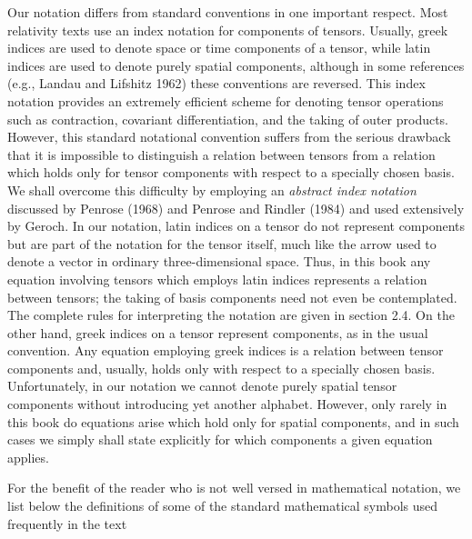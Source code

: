 Our notation differs from standard conventions in one important respect. Most relativity texts use an index notation for components of tensors. Usually, greek indices are used to denote space or time components of a tensor, while latin indices are used to denote purely spatial components, although in some references (e.g., Landau and Lifshitz 1962) these conventions are reversed. This index notation provides an extremely efficient scheme for denoting tensor operations such as contraction, covariant differentiation, and the taking of outer products. However, this standard notational convention suffers from the serious drawback that it is impossible to distinguish a relation between tensors from a relation which holds only for tensor components with respect to a specially chosen basis. We shall overcome this difficulty by employing an \emph{abstract index notation} discussed by Penrose (1968) and Penrose and Rindler (1984) and used extensively by Geroch. In our notation, latin indices on a tensor do not represent components but are part of the notation for the tensor itself, much like the arrow used to denote a vector in ordinary three-dimensional space. Thus, in this book any equation involving tensors which employs latin indices represents a relation between tensors; the taking of basis components need not even be contemplated. The complete rules for interpreting the notation are given in section 2.4. On the other hand, greek indices on a tensor represent components, as in the usual convention. Any equation employing greek indices is a relation between tensor components and, usually, holds only with respect to a specially chosen basis. Unfortunately, in our notation we cannot denote purely spatial tensor components without introducing yet another alphabet. However, only rarely in this book do equations arise which hold only for spatial components, and in such cases we simply shall state explicitly for which components a given equation applies.

For the benefit of the reader who is not well versed in mathematical notation, we list below the definitions of some of the standard mathematical symbols used frequently in the text

